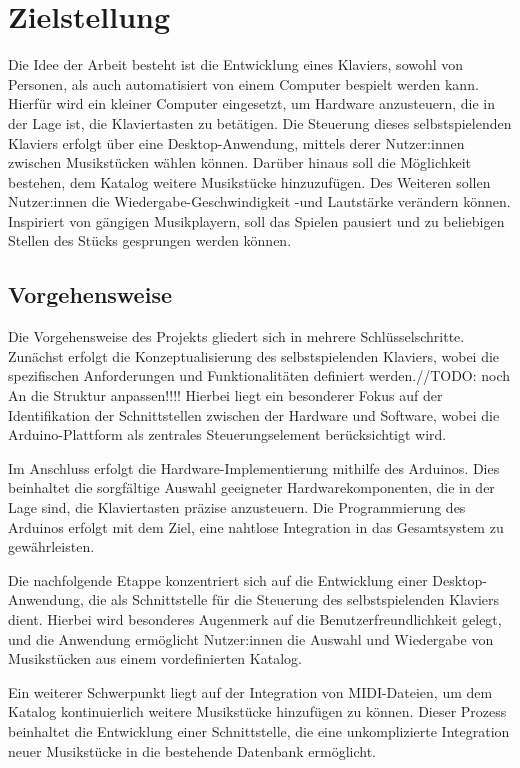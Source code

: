 \chapter{Zielstellung} \label{Zielstellung}

\nocite{*}

Die Idee der Arbeit besteht ist die Entwicklung eines Klaviers, sowohl von Personen, als auch automatisiert von einem Computer bespielt werden kann.
Hierfür wird ein kleiner Computer eingesetzt, um Hardware anzusteuern, die in der Lage ist, die Klaviertasten zu betätigen.
Die Steuerung dieses selbstspielenden Klaviers erfolgt über eine
Desktop-Anwendung, mittels derer Nutzer:innen zwischen Musikstücken wählen können.
Darüber hinaus soll die Möglichkeit bestehen, dem Katalog weitere Musikstücke hinzuzufügen.
Des Weiteren sollen Nutzer:innen die Wiedergabe-Geschwindigkeit -und Lautstärke verändern können.
Inspiriert von gängigen Musikplayern, soll das Spielen pausiert und zu beliebigen Stellen des Stücks gesprungen werden können.


\section{Vorgehensweise} \label{sec:zielstellung-vorgehen}
Die Vorgehensweise des Projekts gliedert sich in mehrere Schlüsselschritte.
Zunächst erfolgt die Konzeptualisierung des selbstspielenden Klaviers, wobei die spezifischen Anforderungen und Funktionalitäten
definiert werden.//TODO: noch An die Struktur anpassen!!!!
Hierbei liegt ein besonderer Fokus auf der Identifikation der Schnittstellen zwischen der
Hardware und Software, wobei die Arduino-Plattform als zentrales Steuerungselement berücksichtigt wird. \newline

Im Anschluss erfolgt die Hardware-Implementierung mithilfe des Arduinos. Dies beinhaltet die sorgfältige
Auswahl geeigneter Hardwarekomponenten, die in der Lage sind, die Klaviertasten präzise anzusteuern.
Die Programmierung des Arduinos erfolgt mit dem Ziel, eine nahtlose Integration in das Gesamtsystem zu
gewährleisten. \newline

Die nachfolgende Etappe konzentriert sich auf die Entwicklung einer
Desktop-Anwendung, die als Schnittstelle für die Steuerung des selbstspielenden Klaviers dient. Hierbei wird
besonderes Augenmerk auf die Benutzerfreundlichkeit gelegt, und die Anwendung ermöglicht Nutzer:innen die
Auswahl und Wiedergabe von Musikstücken aus einem vordefinierten Katalog. \newline

Ein weiterer Schwerpunkt liegt auf der Integration von MIDI-Dateien, um dem Katalog kontinuierlich weitere
Musikstücke hinzufügen zu können.
Dieser Prozess beinhaltet die Entwicklung einer Schnittstelle, die eine
unkomplizierte Integration neuer Musikstücke in die bestehende Datenbank ermöglicht.
